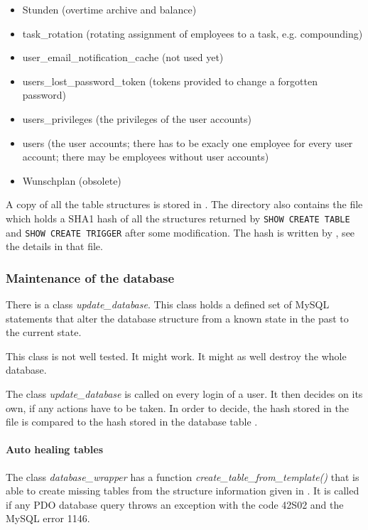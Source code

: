 \begin{itemize}
\item Stunden (overtime archive and balance)
\item task\_rotation (rotating assignment of employees to a task, e.g. compounding)
\item user\_email\_notification\_cache (not used yet)
\item users\_lost\_password\_token (tokens provided to change a forgotten password)
\item users\_privileges (the privileges of the user accounts)
\item users (the user accounts; there has to be exacly one employee for every user account; there may be employees without user accounts)
\item Wunschplan (obsolete)
\end{itemize}


A copy of all the table structures is stored in .
The directory also contains the file  which holds a SHA1 hash of all
the structures returned by \lstinline|SHOW CREATE TABLE| and \lstinline|SHOW CREATE TRIGGER| after some modification.
The hash is written by , see the details in that file.

\subsubsection{Maintenance of the database}
There is a class \emph{update\_database}.
This class holds a defined set of MySQL statements that alter the database structure from a known state in the past to the current state.

This class is not well tested. It might work. It might as well destroy the whole database.

The class \emph{update\_database} is called on every login of a user. It then decides on its own, if any actions have to be taken.
In order to decide, the hash stored in the file  is compared to the hash stored in the database table .

\paragraph{Auto healing tables}
The class \emph{database\_wrapper} has a function \emph{create\_table\_from\_template()} that is able to create missing tables from the structure information given in . It is called if any PDO database query throws an exception with the code 42S02 and the MySQL error 1146.

